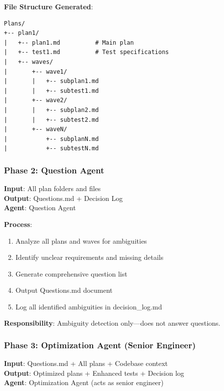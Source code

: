\documentclass[12pt,letterpaper]{article}
\begin{document}
\textbf{File Structure Generated}:
\begin{verbatim}
Plans/
+-- plan1/
|   +-- plan1.md          # Main plan
|   +-- test1.md          # Test specifications
|   +-- waves/
|       +-- wave1/
|       |   +-- subplan1.md
|       |   +-- subtest1.md
|       +-- wave2/
|       |   +-- subplan2.md
|       |   +-- subtest2.md
|       +-- waveN/
|           +-- subplanN.md
|           +-- subtestN.md
\end{verbatim}

\subsubsection{Phase 2: Question Agent}

\textbf{Input}: All plan folders and files\\
\textbf{Output}: Questions.md + Decision Log\\
\textbf{Agent}: Question Agent

\textbf{Process}:
\begin{enumerate}
    \item Analyze all plans and waves for ambiguities
    \item Identify unclear requirements and missing details
    \item Generate comprehensive question list
    \item Output Questions.md document
    \item Log all identified ambiguities in decision\_log.md
\end{enumerate}

\textbf{Responsibility}: Ambiguity detection only—does not answer questions.

\subsubsection{Phase 3: Optimization Agent (Senior Engineer)}

\textbf{Input}: Questions.md + All plans + Codebase context\\
\textbf{Output}: Optimized plans + Enhanced tests + Decision log\\
\textbf{Agent}: Optimization Agent (acts as senior engineer)
\end{document}
